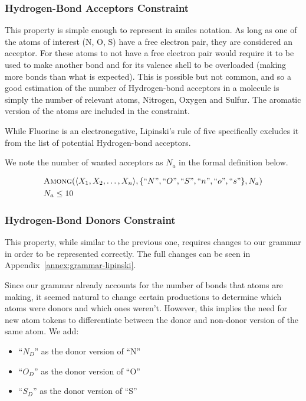 \documentclass[../Document.tex]{subfiles}
\begin{document}
\subsubsection{Hydrogen-Bond Acceptors Constraint}
This property is simple enough to represent in \gls{smiles} notation. As long as one of the atoms of interest (\ie N, O, S) have a free electron pair, they are considered an acceptor. For these atoms to not have a free electron pair would require it to be used to make another bond and for its valence shell to be overloaded (\ie making more bonds than what is expected). This is possible but not common, and so a good estimation of the number of Hydrogen-bond acceptors in a molecule is simply the number of relevant atoms, \ie Nitrogen, Oxygen and Sulfur.
The aromatic version of the atoms are included in the constraint.

While Fluorine is an electronegative, Lipinski's rule of five specifically excludes it from the list of potential Hydrogen-bond acceptors\cite{LIPINSKI20013}.

We note the number of wanted acceptors as $N_a$ in the formal definition below.

\begin{align*}
    &\mbox{\sc Among}(\langle X_1, X_2, \ldots, X_n \rangle, \{``N",``O",``S",``n",``o",``s"\}, N_a)\\
    &N_a \leq 10
\end{align*}


\subsubsection{Hydrogen-Bond Donors Constraint}
This property, while similar to the previous one, requires changes to our grammar in order to be represented correctly. The full changes can be seen in Appendix~\ref{annex:grammar-lipinski}.

Since our grammar already accounts for the number of bonds that atoms are making, it seemed natural to change certain productions to determine which atoms were donors and which ones weren't. However, this implies the need for new atom tokens to differentiate between the donor and non-donor version of the same atom. We add:
\begin{itemize}
    \item ``$N_D$'' as the donor version of ``N''
    \item ``$O_D$'' as the donor version of ``O''
    \item ``$S_D$'' as the donor version of ``S''
\end{itemize}
\end{document}
